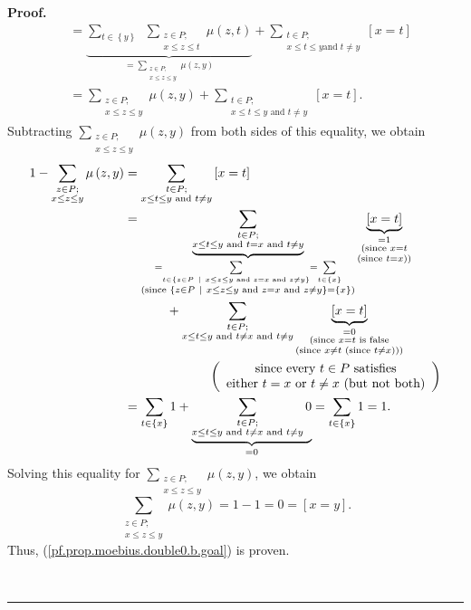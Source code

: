 \documentclass[numbers=enddot,12pt,final,onecolumn,notitlepage]{scrartcl}%
\theoremstyle{definition}
\newenvironment{proof}[1][Proof]{\noindent\textbf{#1.} }{\ \rule{0.5em}{0.5em}}
\newenvironment{verlong}{}{}
\let\sumnonlimits\sum
\renewcommand{\sum}{\sumnonlimits\limits}
\begin{document}
\begin{verlong}
\begin{proof}
\begin{align*}
&  =\underbrace{\sum_{t\in\left\{  y\right\}  }\ \ \sum_{\substack{z\in
P;\\x\leq z\leq t}}\mu\left(  z,t\right)  }_{=\sum_{\substack{z\in P;\\x\leq
z\leq y}}\mu\left(  z,y\right)  }+\sum_{\substack{t\in P;\\x\leq t\leq y\text{
and }t\neq y}}\left[  x=t\right] \\
&  =\sum_{\substack{z\in P;\\x\leq z\leq y}}\mu\left(  z,y\right)
+\sum_{\substack{t\in P;\\x\leq t\leq y\text{ and }t\neq y}}\left[
x=t\right]  .
\end{align*}
Subtracting $\sum_{\substack{z\in P;\\x\leq z\leq y}}\mu\left(  z,y\right)  $
from both sides of this equality, we obtain%
\begin{align*}
1-\sum_{\substack{z\in P;\\x\leq z\leq y}}\mu\left(  z,y\right)   &
=\sum_{\substack{t\in P;\\x\leq t\leq y\text{ and }t\neq y}}\left[  x=t\right]
\\
&  =\underbrace{\sum_{\substack{t\in P;\\x\leq t\leq y\text{ and }t=x\text{
and }t\neq y}}}_{\substack{=\sum_{t\in\left\{  z\in P\ \mid\ x\leq z\leq
y\text{ and }z=x\text{ and }z\neq y\right\}  }=\sum_{t\in\left\{  x\right\}
}\\\text{(since }\left\{  z\in P\ \mid\ x\leq z\leq y\text{ and }z=x\text{ and
}z\neq y\right\}  =\left\{  x\right\}  \text{)}}}\underbrace{\left[
x=t\right]  }_{\substack{=1\\\text{(since }x=t\\\text{(since }t=x\text{))}}}\\
&  \ \ \ \ \ \ \ \ \ \ +\sum_{\substack{t\in P;\\x\leq t\leq y\text{ and
}t\neq x\text{ and }t\neq y}}\underbrace{\left[  x=t\right]  }%
_{\substack{=0\\\text{(since }x=t\text{ is false}\\\text{(since }x\neq t\text{
(since }t\neq x\text{)))}}}\\
&  \ \ \ \ \ \ \ \ \ \ \ \ \ \ \ \ \ \ \ \ \left(
\begin{array}
[c]{c}%
\text{since every }t\in P\text{ satisfies}\\
\text{either }t=x\text{ or }t\neq x\text{ (but not both)}%
\end{array}
\right) \\
&  =\sum_{t\in\left\{  x\right\}  }1+\underbrace{\sum_{\substack{t\in
P;\\x\leq t\leq y\text{ and }t\neq x\text{ and }t\neq y}}0}_{=0}=\sum
_{t\in\left\{  x\right\}  }1=1.
\end{align*}
Solving this equality for $\sum_{\substack{z\in P;\\x\leq z\leq y}}\mu\left(
z,y\right)  $, we obtain%
\[
\sum_{\substack{z\in P;\\x\leq z\leq y}}\mu\left(  z,y\right)  =1-1=0=\left[
x=y\right]  .
\]
Thus, (\ref{pf.prop.moebius.double0.b.goal}) is proven.


\end{proof}
\end{verlong}
\end{document}

